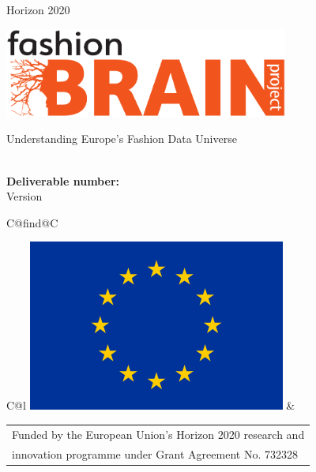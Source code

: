 \begin{center}
Horizon 2020
\vspace{2cm}

  \begin{center}



  \includegraphics[width=0.7\textwidth]{logo_white.pdf}
  \vspace{2mm}

  \end{center}
  \vspace{0.5cm}
  {\Large Understanding Europe's Fashion Data Universe\\}
  \vspace{2cm}
  
  \begin{spacing}{2.5}
    \textbf{\Huge \DelTitle}\\\vspace{10mm}
    \textbf{\Large Deliverable number: \DelNumber} \\\vspace{10mm} 
    {\large Version \DelVersion}
  \end{spacing}
  
  \vspace*{\fill}

  \newcommand\undefcolumntype[1]{\expandafter\let\csname NC@find@#1\endcsname\relax}
  \newcommand\forcenewcolumntype[1]{\undefcolumntype{#1}\newcolumntype{#1}}
  \forcenewcolumntype{C}{ >{\arraybackslash} m{3cm} }


  \begin{tabular}{C@{\hspace*{0cm}}l}
    \includegraphics[scale=0.2]{images/logos/EU_Flag_320_213} &
    \begin{tabular}{l}
    {Funded by the European Union’s Horizon 2020 research and }\\
    {innovation programme under Grant Agreement No. 732328}\\
    \end{tabular}
  \end{tabular}
\end{center}

